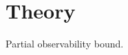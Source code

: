 \section{Theory}\label{sec:theory}\begin{theorem}\label{thm:partial-obs}Partial observability bound.\end{theorem}